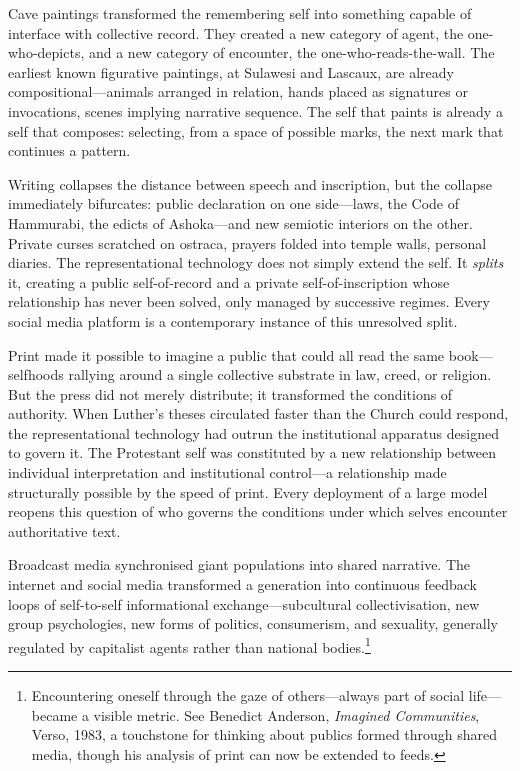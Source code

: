 Cave paintings transformed the remembering self into something capable of interface with collective record. They created a new category of agent, the one-who-depicts, and a new category of encounter, the one-who-reads-the-wall. The earliest known figurative paintings, at Sulawesi and Lascaux, are already compositional---animals arranged in relation, hands placed as signatures or invocations, scenes implying narrative sequence. The self that paints is already a self that composes: selecting, from a space of possible marks, the next mark that continues a pattern.

Writing collapses the distance between speech and inscription, but the collapse immediately bifurcates: public declaration on one side---laws, the Code of Hammurabi, the edicts of Ashoka---and new semiotic interiors on the other. Private curses scratched on ostraca, prayers folded into temple walls, personal diaries. The representational technology does not simply extend the self. It \textit{splits} it, creating a public self-of-record and a private self-of-inscription whose relationship has never been solved, only managed by successive regimes. Every social media platform is a contemporary instance of this unresolved split.

Print made it possible to imagine a public that could all read the same book---selfhoods rallying around a single collective substrate in law, creed, or religion. But the press did not merely distribute; it transformed the conditions of authority. When Luther's theses circulated faster than the Church could respond, the representational technology had outrun the institutional apparatus designed to govern it. The Protestant self was constituted by a new relationship between individual interpretation and institutional control---a relationship made structurally possible by the speed of print. Every deployment of a large model reopens this question of who governs the conditions under which selves encounter authoritative text.

Broadcast media synchronised giant populations into shared narrative. The internet and social media transformed a generation into continuous feedback loops of self-to-self informational exchange---subcultural collectivisation, new group psychologies, new forms of politics, consumerism, and sexuality, generally regulated by capitalist agents rather than national bodies.\footnote{Encountering oneself through the gaze of others---always part of social life---became a visible metric. See Benedict Anderson, \emph{Imagined Communities}, Verso, 1983, a touchstone for thinking about publics formed through shared media, though his analysis of print can now be extended to feeds.}

